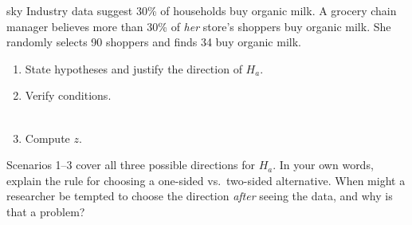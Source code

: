 \documentclass[10pt]{article}
\begin{document}
\begin{scenariobox}{sky}
Industry data suggest 30\% of households buy organic milk. A grocery chain manager believes
more than 30\% of \emph{her} store's shoppers buy organic milk. She randomly selects 90
shoppers and finds 34 buy organic milk.

\begin{enumerate}[label=\alph*.]
  \item State hypotheses and justify the direction of $H_a$.
        \\
  \item Verify conditions.
        \\
        \\
  \item Compute $z$.
        \\
\end{enumerate}
\end{scenariobox}

\begin{reflectionbox}
Scenarios 1--3 cover all three possible directions for $H_a$. In your own words, explain the
rule for choosing a one-sided vs.\ two-sided alternative. When might a researcher be tempted
to choose the direction \emph{after} seeing the data, and why is that a problem?
\\
\\
\end{reflectionbox}
\end{document}
